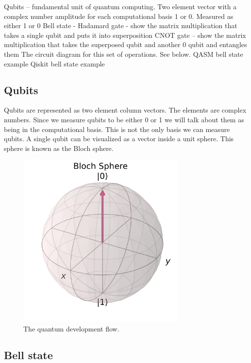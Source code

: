 \documentclass{article}
\begin{document}
\begin{outline}[enumerate]
\1 Qubits -- fundamental unit of quantum computing. Two element vector with a complex number amplitude for each computational basis 1 or 0. Measured as either 1 or 0
\1 Bell state - 
    \2 Hadamard gate - show the matrix multiplication that takes a single qubit and puts it into superposition
    \2 CNOT gate -- show the matrix multiplication that takes the superposed qubit and another 0 qubit and entangles them
\1 The circuit diagram for this set of operations. See below.
\1 QASM bell state example
\1 Qiskit bell state example
\end{outline}
\subsection{Qubits}

Qubits are represented as two element column vectors. The elements are complex numbers. Since we measure qubits to be either 0 or 1 we will talk about them as being in the computational basis. This is not the only basis we can measure qubits. A single qubit can be visualized as a vector inside a unit sphere. This sphere is known as the Bloch sphere. 

\begin{figure}[H]
    \centering
    \includegraphics[width=0.75\textwidth]{bloch0.png}
    \caption{The quantum development flow.}
\end{figure}

\subsection{Bell state}
\end{document}
